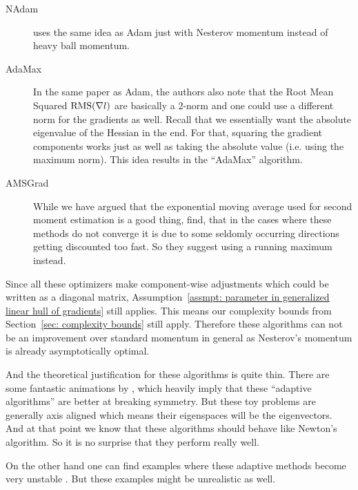 \begin{description}
	\item[NAdam] \parencite{dozatIncorporatingNesterovMomentum2016}
	uses the same idea as Adam just with Nesterov momentum instead of heavy ball
	momentum.

	\item[AdaMax] \parencite{kingmaAdamMethodStochastic2017} In the same paper
	as Adam, the authors also note that the Root Mean Squared
	\(\text{RMS}(\nabla l)\) are basically a \(2\)-norm and one could use a
	different norm for the gradients as well.  Recall that we essentially want
	the absolute eigenvalue of the Hessian in the end. For that, squaring
	the gradient components works just as well as taking the absolute value (i.e.
	using the maximum norm). This idea results in the ``AdaMax'' algorithm.

	\item[AMSGrad] \parencite{reddiConvergenceAdam2019} While we have argued that
	the exponential moving average used for second moment estimation is a good
	thing, \textcite{reddiConvergenceAdam2019} find, that in the cases where
	these methods do not converge it is due to some seldomly occurring directions
	getting discounted too fast. So they suggest using a running maximum instead.
\end{description}

Since all these optimizers make component-wise adjustments which could be written
as a diagonal matrix, Assumption~\ref{assmpt: parameter in generalized linear
hull of gradients} still applies. This means our complexity bounds from
Section~\ref{sec: complexity bounds} still apply. Therefore these algorithms
can not be an improvement over standard momentum in general as Nesterov's
momentum is already asymptotically optimal.

And the theoretical justification for these algorithms is quite thin. There
are some fantastic animations by \textcite{radfordVisualizingOptimizationAlgos2014},
which heavily imply that these ``adaptive algorithms'' are better at breaking
symmetry. But these toy problems are generally axis aligned which means their
eigenspaces will be the eigenvectors. And at that point we know that these
algorithms should behave like Newton's algorithm. So it is no surprise that they
perform really well.

On the other hand one can find examples where these adaptive methods become very
unstable
\parencite[e.g.][]{wilsonMarginalValueAdaptive2018,reddiConvergenceAdam2019}.
But these examples might be unrealistic as well.

